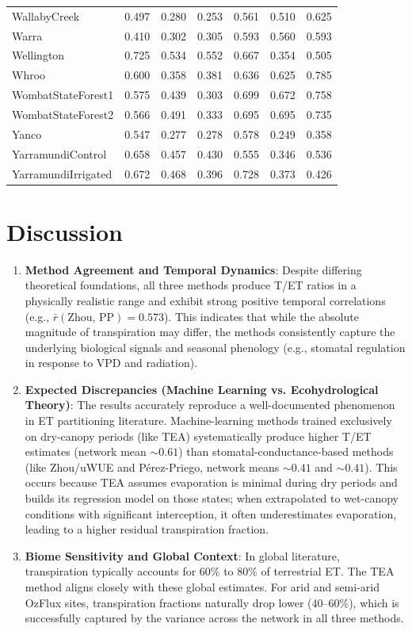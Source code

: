 \documentclass[11pt,a4paper]{article}
\begin{document}
\begin{longtable}{lcccccc}
  WallabyCreek & 0.497 & 0.280 & 0.253 & 0.561 & 0.510 & 0.625 \\
  Warra & 0.410 & 0.302 & 0.305 & 0.593 & 0.560 & 0.593 \\
  Wellington & 0.725 & 0.534 & 0.552 & 0.667 & 0.354 & 0.505 \\
  Whroo & 0.600 & 0.358 & 0.381 & 0.636 & 0.625 & 0.785 \\
  WombatStateForest1 & 0.575 & 0.439 & 0.303 & 0.699 & 0.672 & 0.758 \\
  WombatStateForest2 & 0.566 & 0.491 & 0.333 & 0.695 & 0.695 & 0.735 \\
  Yanco & 0.547 & 0.277 & 0.278 & 0.578 & 0.249 & 0.358 \\
  YarramundiControl & 0.658 & 0.457 & 0.430 & 0.555 & 0.346 & 0.536 \\
  YarramundiIrrigated & 0.672 & 0.468 & 0.396 & 0.728 & 0.373 & 0.426 \\
\end{longtable}

\section{Discussion}
\begin{enumerate}
  \item \textbf{Method Agreement and Temporal Dynamics}: Despite differing theoretical foundations, all three methods produce T/ET ratios in a physically realistic range and exhibit strong positive temporal correlations (e.g., $\bar{r}(\text{Zhou, PP}) = 0.573$). This indicates that while the absolute magnitude of transpiration may differ, the methods consistently capture the underlying biological signals and seasonal phenology (e.g., stomatal regulation in response to VPD and radiation).
  
  \item \textbf{Expected Discrepancies (Machine Learning vs. Ecohydrological Theory)}: The results accurately reproduce a well-documented phenomenon in ET partitioning literature. Machine-learning methods trained exclusively on dry-canopy periods (like TEA) systematically produce higher T/ET estimates (network mean $\sim 0.61$) than stomatal-conductance-based methods (like Zhou/uWUE and P\'erez-Priego, network means $\sim 0.41$ and $\sim 0.41$). This occurs because TEA assumes evaporation is minimal during dry periods and builds its regression model on those states; when extrapolated to wet-canopy conditions with significant interception, it often underestimates evaporation, leading to a higher residual transpiration fraction.
  
  \item \textbf{Biome Sensitivity and Global Context}: In global literature, transpiration typically accounts for 60\% to 80\% of terrestrial ET. The TEA method aligns closely with these global estimates. For arid and semi-arid OzFlux sites, transpiration fractions naturally drop lower (40--60\%), which is successfully captured by the variance across the network in all three methods.
\end{enumerate}
\end{document}
